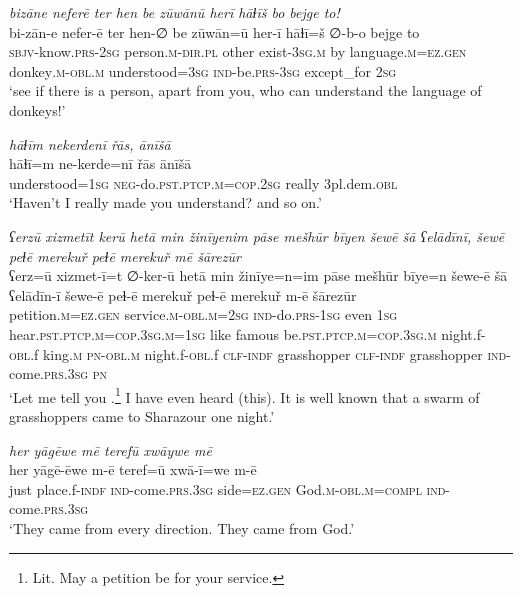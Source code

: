 \ea \label{HB.91}
\textit{bizāne neferē ter hen be zūwānū herī hāɫīš bo bejge to!} \\ 
\gll bi-zān-e nefer-ē ter hen-∅ be zūwān=ū her-ī hāɫī=š ∅-b-o bejge to \\ 
 \textsc{sbjv-}know\textsc{.prs}-\textsc{2sg} person\textsc{.m}\textsc{-dir}\textsc{.pl} other exist\textsc{-3sg}\textsc{.m} by language\textsc{.m}\textsc{=ez}\textsc{.gen} donkey\textsc{.m}\textsc{-obl}\textsc{.m} understood\textsc{=3sg} \textsc{ind-}be\textsc{.prs}\textsc{-3sg} except\_for \textsc{2sg} \\ 
\glt `see if there is a person, apart from you, who can understand the language of donkeys!'
\z 
 
\ea \label{HB.93}
\textit{hāɫīm nekerdenī řās, ānīšā} \\ 
\gll hāɫī=m ne-kerde=nī řās ānīšā \\ 
 understood\textsc{=1sg} \textsc{neg-}do\textsc{.pst}\textsc{.ptcp}\textsc{.m}\textsc{=cop}\textsc{.\textsc{2sg}} really 3pl.dem\textsc{.obl} \\ 
\glt `Haven’t I really made you understand? and so on.'
\z 


\ea \label{PM.1}
\textit{ʕerzū xizmetīt kerū hetā min žinīyenim pāse mešhūr bīyen šewē šā ʕelādīnī, šewē peɫē merekuř peɫē merekuř mē šārezūr} \\ 
\gll ʕerz=ū xizmet-ī=t ∅-ker-ū hetā min žinīye=n=im pāse mešhūr bīye=n šewe-ē šā ʕelādīn-ī šewe-ē peɫ-ē merekuř peɫ-ē merekuř m-ē šārezūr \\ 
 petition\textsc{.m}\textsc{\textsc{=ez.gen}} service\textsc{.m}\textsc{-obl}\textsc{.m}\textsc{=\textsc{2sg}} \textsc{ind-}do\textsc{.prs}\textsc{-\textsc{1sg}} even \textsc{1sg} hear\textsc{.pst}\textsc{.ptcp}\textsc{.m}\textsc{=cop}\textsc{.3sg}\textsc{.m}\textsc{=\textsc{1sg}} like famous be\textsc{.pst}\textsc{.ptcp}\textsc{.m}\textsc{=cop}\textsc{.3sg}\textsc{.m} night.f\textsc{-obl}.f king\textsc{.m} \textsc{pn}\textsc{-obl}\textsc{.m} night.f\textsc{-obl}.f \textsc{clf}\textsc{-indf} grasshopper \textsc{clf}\textsc{-indf} grasshopper \textsc{ind-}come\textsc{.prs}\textsc{.3sg} \textsc{pn} \\ 
\glt `Let me tell you .\footnote{Lit. May a petition be for your service.} I have even heard (this). It is well known that a swarm of grasshoppers came to Sharazour one night.'
\z 
 
\ea \label{PM.3}
\textit{her yāgēwe mē terefū xwāywe mē} \\ 
\gll her yāgē-ēwe m-ē teref=ū xwā-ī=we m-ē \\ 
 just place.f\textsc{-indf} \textsc{ind-}come\textsc{.prs}\textsc{.3sg} side\textsc{\textsc{=ez.gen}} God\textsc{.m}\textsc{-obl}\textsc{.m}\textsc{=compl} \textsc{ind-}come\textsc{.prs}\textsc{.3sg} \\ 
\glt `They came from every direction. They came from God.'
\z 
 
